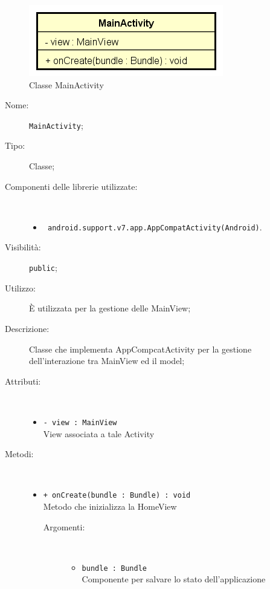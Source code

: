 \documentclass[../DefinizioneDiProdotto.tex]{subfiles}
\begin{document}
    \begin{figure}[H]
        \centering
        \includegraphics{img/MainActivity.png}
        \caption{Classe MainActivity}\label{fig:presenter::MainActivity} 
    \end{figure}
    \begin{description}
\item[Nome:] \texttt{MainActivity};
\item[Tipo:] Classe;
\item[Componenti delle librerie utilizzate:] \
\begin{itemize}
\item \texttt{ android.support.v7.app.AppCompatActivity(Android)}.

\end{itemize}
\item[Visibilità:] \texttt{public};
\item[Utilizzo:] È utilizzata per la gestione delle MainView;
\item[Descrizione:] Classe che implementa AppCompcatActivity per la gestione dell'interazione tra MainView ed il model;
\item[Attributi:] \
\begin{itemize}
\item \texttt{- view : MainView}\\
View associata a tale Activity

\end{itemize}
\item[Metodi:] \
\begin{itemize}
\item \texttt{+ onCreate(bundle : Bundle) : void}\\
Metodo che inizializza la HomeView
 \begin{description}
\item[Argomenti:] \
\begin{itemize}
\item \texttt{bundle : Bundle}\\
Componente per salvare lo stato dell'applicazione\end{itemize}
\end{description}
\end{itemize}
\end{description}
\end{document}
